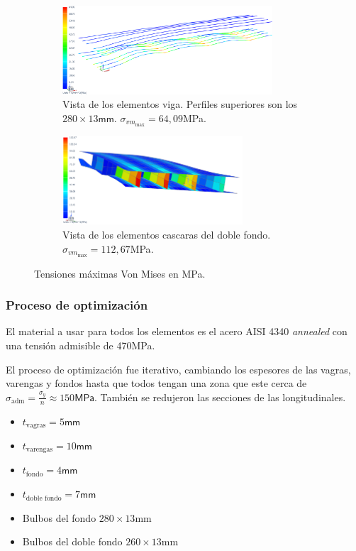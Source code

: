 \documentclass[onecolumn,10pt,titlepage]{article}
\newcommand{\adm}{\textrm{adm}}
\newcommand{\unit}[1]{\textsf{#1}}
\newcommand{\mega}{\unit{M}}
\newcommand{\milli}{\unit{m}}
\newcommand{\meter}{\unit{m}}
\newcommand{\pascal}{\unit{Pa}}
\newcommand{\si}[1]{#1}
\newcommand{\SI}[2]{#1\si{#2}}
\begin{document}
 \begin{figure}[htb!]
 \centering
 \begin{subfigure}{0.49\textwidth}
 \begin{framed}
 \includegraphics[height=3.3cm]{fig/longitudinales_a.png}
 \caption{Vista de los elementos viga. Perfiles superiores son los $280\times 13\si{\milli \meter}$. $\sigma_{vm_{\max}}= 64,09 $\si{\mega \pascal}.}
 \label{fig:longitudinalesCasoA}
 \end{framed}
 \end{subfigure}
 \begin{subfigure}{0.49\textwidth}
 \begin{framed}
 \includegraphics[height=3.3cm]{fig/varengas_a.png}
 \caption{Vista de los elementos cascaras del doble fondo. $\sigma_{vm_{\max}}= 112,67 $\si{\mega \pascal}.}
 \label{fig:VarengasCasoA}
 \end{framed}
 \end{subfigure}
 \caption{Tensiones máximas Von Mises en \si{\mega \pascal}.}
 \label{fig:2a}
 \end{figure}

\subsubsection*{Proceso de optimización}
El material a usar para todos los elementos es el acero AISI 4340 \emph{annealed} con una tensión admisible de \SI{470}{\mega \pascal}.

El proceso de optimización fue iterativo, cambiando los espesores de las vagras, varengas y fondos hasta que todos tengan una zona que este cerca de $\sigma_{\adm}=\frac{\sigma_{y}}{n}\approx\SI{150}{\mega \pascal}$. También se redujeron las secciones de las longitudinales.
\begin{itemize}
	\item $t_{\textrm{vagras}}=\SI{5}{\milli \meter}$
	\item $t_{\textrm{varengas}}=\SI{10}{\milli \meter}$
	\item $t_{\textrm{fondo}}=\SI{4}{\milli \meter}$
	\item $t_{\textrm{doble fondo}}=\SI{7}{\milli \meter}$
	\item Bulbos del fondo $280\times 13$\si{\milli \meter}
	\item Bulbos del doble fondo $260\times 13$\si{\milli \meter}
\end{itemize}
\end{document}
